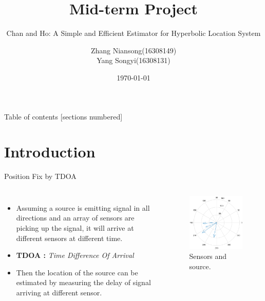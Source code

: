 \documentclass[10pt]{beamer}
\title{Mid-term Project}
\subtitle{Chan and Ho: A Simple and Efficient Estimator for Hyperbolic Location System}
\date{\today}
\author{Zhang Niansong\quad(16308149) \\ Yang Songyi\quad(16308131)}
\begin{document}
\maketitle

\begin{frame}{Table of contents}
  [sections numbered]
  \tableofcontents[hideallsubsections]
\end{frame}


\section{Introduction}

\begin{frame}{Position Fix by TDOA}
  \begin{columns}[T,onlytextwidth]
      \begin{itemize}
        \item Assuming a source is emitting signal in all directions
              and an array of sensors are picking up the signal,
              it will arrive at different sensors at different time.
        \item \textbf{TDOA :} \textit{Time Difference Of Arrival}
        \item Then the location of the source can be estimated
              by measuring the delay of signal arriving at different sensor.
      \end{itemize}
      \begin{figure}[t]
        \includegraphics[width=1\textwidth]{intro.png}
        \caption{Sensors and source.}
      \end{figure}
  \end{columns}
\end{frame}
\end{document}

